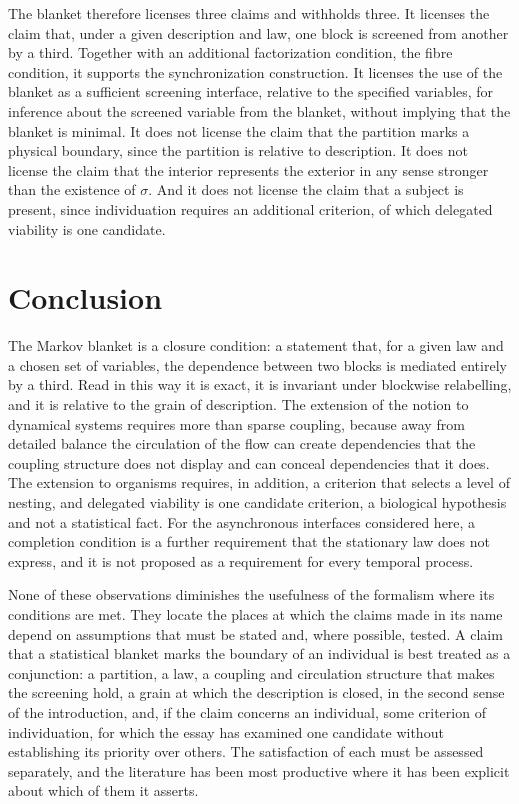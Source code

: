 \documentclass[11pt]{article}
\theoremstyle{definition}
\begin{document}
The blanket therefore licenses three claims and withholds three. It licenses the claim that, under a given description and law, one block is screened from another by a third. Together with an additional factorization condition, the fibre condition, it supports the synchronization construction. It licenses the use of the blanket as a sufficient screening interface, relative to the specified variables, for inference about the screened variable from the blanket, without implying that the blanket is minimal. It does not license the claim that the partition marks a physical boundary, since the partition is relative to description. It does not license the claim that the interior represents the exterior in any sense stronger than the existence of $\sigma$. And it does not license the claim that a subject is present, since individuation requires an additional criterion, of which delegated viability is one candidate.

\section{Conclusion}

The Markov blanket is a closure condition: a statement that, for a given law and a chosen set of variables, the dependence between two blocks is mediated entirely by a third. Read in this way it is exact, it is invariant under blockwise relabelling, and it is relative to the grain of description. The extension of the notion to dynamical systems requires more than sparse coupling, because away from detailed balance the circulation of the flow can create dependencies that the coupling structure does not display and can conceal dependencies that it does. The extension to organisms requires, in addition, a criterion that selects a level of nesting, and delegated viability is one candidate criterion, a biological hypothesis and not a statistical fact. For the asynchronous interfaces considered here, a completion condition is a further requirement that the stationary law does not express, and it is not proposed as a requirement for every temporal process.

None of these observations diminishes the usefulness of the formalism where its conditions are met. They locate the places at which the claims made in its name depend on assumptions that must be stated and, where possible, tested. A claim that a statistical blanket marks the boundary of an individual is best treated as a conjunction: a partition, a law, a coupling and circulation structure that makes the screening hold, a grain at which the description is closed, in the second sense of the introduction, and, if the claim concerns an individual, some criterion of individuation, for which the essay has examined one candidate without establishing its priority over others. The satisfaction of each must be assessed separately, and the literature has been most productive where it has been explicit about which of them it asserts.
\end{document}
